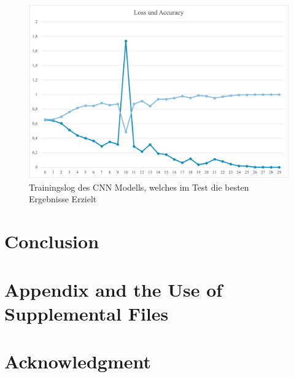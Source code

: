 \documentclass[journal,twoside,web]{ieeecolor}
\begin{document}
\begin{figure}[!t]
    \centerline{\includegraphics[width=\columnwidth]{Andi/Loss_Acc_Gewinner.png}}
    \caption{Trainingslog des CNN Modells, welches im Test die besten Ergebnisse Erzielt}
    \label{fig:winner}
\end{figure}





\section{Conclusion}


\appendices

\section*{Appendix and the Use of Supplemental Files}


\section*{Acknowledgment}
\end{document}
